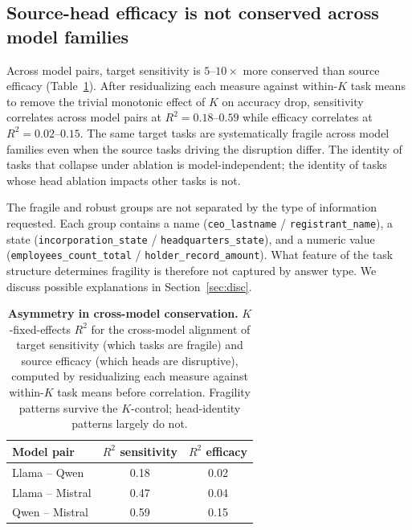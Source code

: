 \subsection{Source-head efficacy is not conserved across model families}
\label{sec:result-asymmetry}
 
Across model pairs, target sensitivity is $5$--$10\times$ more conserved than
source efficacy (Table~\ref{tab:kfe}). After residualizing each measure
against within-$K$ task means to remove the trivial monotonic effect of $K$
on accuracy drop, sensitivity correlates across model pairs at
$R^2 = 0.18$--$0.59$ while efficacy correlates at $R^2 = 0.02$--$0.15$.
The same target tasks are systematically fragile across model families even
when the source tasks driving the disruption differ. The identity of tasks
that collapse under ablation is model-independent; the identity of tasks
whose head ablation impacts other tasks is not.
 
The fragile and robust groups are not separated by the type of information
requested. Each group contains a name (\texttt{ceo\_lastname} /
\texttt{registrant\_name}), a state (\texttt{incorporation\_state} /
\texttt{headquarters\_state}), and a numeric value
(\texttt{employees\_count\_total} / \texttt{holder\_record\_amount}).
What feature of the task structure determines fragility is therefore not
captured by answer type. We discuss possible explanations in
Section~\ref{sec:disc}.
 
\begin{table}[t]
\centering
\small
\begin{tabular}{lcc}
\toprule
Model pair & $R^2$ sensitivity & $R^2$ efficacy \\
\midrule
Llama -- Qwen     & 0.18 & 0.02 \\
Llama -- Mistral  & 0.47 & 0.04 \\
Qwen -- Mistral   & 0.59 & 0.15 \\
\bottomrule
\end{tabular}
\caption{\textbf{Asymmetry in cross-model conservation.} $K$-fixed-effects
$R^2$ for the cross-model alignment of target sensitivity (which tasks are
fragile) and source efficacy (which heads are disruptive), computed by
residualizing each measure against within-$K$ task means before correlation.
Fragility patterns survive the $K$-control; head-identity patterns largely do
not.}
\label{tab:kfe}
\end{table}
 
